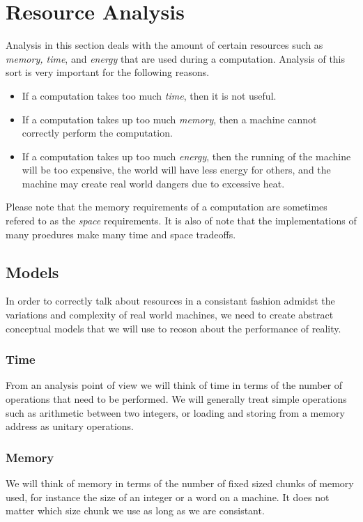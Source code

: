 \documentclass[12pt, letterpaper]{book}
\begin{document}
	\section{Resource Analysis}

	Analysis in this section deals with the amount of certain resources such as \textit{memory, time}, and \textit{energy} that are used during a computation. Analysis of this sort is very important for the following reasons.
\begin{itemize}
  \item  If a computation takes too much \textit{time}, then it is not useful.
  \item  If a computation takes up too much \textit{memory}, then a machine cannot correctly perform the computation.
  \item  If a computation takes up too much \textit{energy}, then the running of the machine will be too expensive, the world will have less energy for others, and the machine may create real world dangers due to excessive heat.
\end{itemize}
	Please note that the memory requirements of a computation are sometimes refered to as the \textit{space} requirements. It is also of note that the implementations of many proedures make many time and space tradeoffs.

		\subsection{Models}

In order to correctly talk about resources in a consistant fashion admidst the variations and complexity of real world machines, we need to create abstract conceptual models that we will use to reoson about the performance of reality. 
\subsubsection{Time}
	From an analysis point of view we will think of time in terms of the number of operations that need to be performed. We will generally treat simple operations such as arithmetic between two integers, or loading and storing from a memory address as unitary operations.
\subsubsection{Memory}
	We will think of memory in terms of the number of fixed sized chunks of memory used, for instance the size of an integer or a word on a machine. It does not matter which size chunk we use as long as we are consistant.
\end{document}
